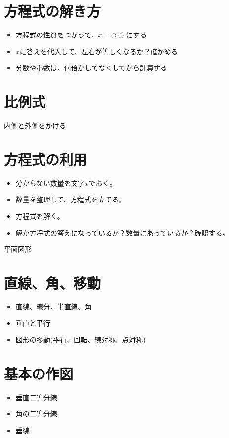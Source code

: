 \documentclass[11pt]{article}
\begin{document}
\section{方程式の解き方}
\begin{itemize}
\item 方程式の性質をつかって、$x=○○$にする
\item $x$に答えを代入して、左右が等しくなるか？確かめる
\item 分数や小数は、何倍かしてなくしてから計算する
\end{itemize}

\section{比例式}
内側と外側をかける

\section{方程式の利用}
\begin{itemize}
\item 分からない数量を文字$x$でおく。
\item 数量を整理して、方程式を立てる。
\item 方程式を解く。
\item 解が方程式の答えになっているか？数量にあっているか？確認する。
\end{itemize}

\newpage

{\LARGE \noindent 平面図形}

\section{直線、角、移動}
\begin{itemize}
\item 直線、線分、半直線、角
\item 垂直と平行
\item 図形の移動(平行、回転、線対称、点対称)
\end{itemize}

\section{基本の作図}
\begin{itemize}
\item 垂直二等分線
\item 角の二等分線
\item 垂線
\end{itemize}
\end{document}

